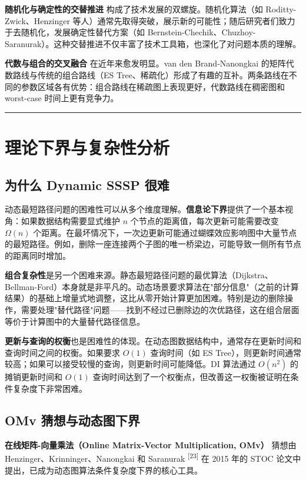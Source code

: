 \documentclass[12pt,a4paper]{ctexart}
\let\oldsection\section
\renewcommand{\section}{\clearpage\oldsection}
\begin{document}
\textbf{随机化与确定性的交替推进} 构成了技术发展的双螺旋。随机化算法（如 Roditty-Zwick、Henzinger 等人）通常先取得突破，展示新的可能性；随后研究者们致力于去随机化，发展确定性替代方案（如 Bernstein-Chechik、Chuzhoy-Saranurak）。这种交替推进不仅丰富了技术工具箱，也深化了对问题本质的理解。

\textbf{代数与组合的交叉融合} 在近年来愈发明显。van den Brand-Nanongkai 的矩阵代数路线与传统的组合路线（ES Tree、稀疏化）形成了有趣的互补。两条路线在不同的参数区域各有优势：组合路线在稀疏图上表现更好，代数路线在稠密图和 worst-case 时间上更有竞争力。


\noindent\rule{\textwidth}{0.4pt}
\section{理论下界与复杂性分析}

\subsection{为什么 Dynamic SSSP 很难}

动态最短路径问题的困难性可以从多个维度理解。\textbf{信息论下界}提供了一个基本视角：如果数据结构需要显式维护 $n$ 个节点的距离值，每次更新可能需要改变 $\Omega(n)$ 个距离。在最坏情况下，一次边更新可能通过蝴蝶效应影响图中大量节点的最短路径。例如，删除一座连接两个子图的唯一桥梁边，可能导致一侧所有节点的距离同时增加。

\textbf{组合复杂性}是另一个困难来源。静态最短路径问题的最优算法（Dijkstra、Bellman-Ford）本身就是非平凡的。动态场景要求算法在"部分信息"（之前的计算结果）的基础上增量式地调整，这比从零开始计算更加困难。特别是边的删除操作，需要处理"替代路径"问题——找到不经过已删除边的次优路径，这在组合层面等价于计算图中的大量替代路径信息。

\textbf{更新与查询的权衡}也是困难性的体现。在动态图数据结构中，通常存在更新时间和查询时间之间的权衡。如果要求 $O(1)$ 查询时间（如 ES Tree），则更新时间通常较高；如果可以接受较慢的查询，则更新时间可能降低。DI 算法通过 $O(n^2)$ 的摊销更新时间和 $O(1)$ 查询时间达到了一个权衡点，但改善这一权衡被证明在条件复杂度下非常困难。

\subsection{OMv 猜想与动态图下界}

\textbf{在线矩阵-向量乘法（Online Matrix-Vector Multiplication, OMv）} 猜想由 Henzinger、Krinninger、Nanongkai 和 Saranurak \textsuperscript{[23]}  在 2015 年的 STOC 论文中提出，已成为动态图算法条件复杂度下界的核心工具。
\end{document}

